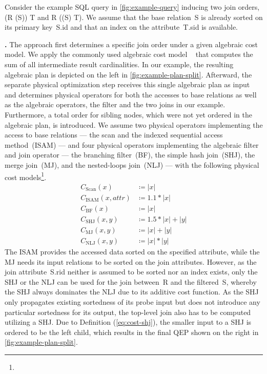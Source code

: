 \noindent Consider the example SQL query in \autoref{fig:example-query} inducing two join orders, \ie (R \join \filter(S)) \join T and R \join (\filter(S) \join T).  We assume that the base relation~S is already sorted on its primary key~S.id and that an index on the attribute~T.sid is available.

\textbf{\split.}
The approach \split first determines a specific join order under a given algebraic cost model.  We apply the commonly used algebraic cost model \Cout~\cite{book_moerkotte, mutable_join_ordering} that computes the sum of all intermediate result cardinalities.  In our example, the resulting algebraic plan is depicted on the left in \autoref{fig:example-plan-split}.  Afterward, the separate physical optimization step receives this single algebraic plan as input and determines physical operators for both the accesses to base relations as well as the algebraic operators, \ie the filter and the two joins in our example.  Furthermore, a total order for sibling nodes, which were not yet ordered in the algebraic plan, is introduced.  We assume two physical operators implementing the access to base relations --- the scan and the indexed sequential access method~(ISAM) --- and four physical operators implementing the algebraic filter and join operator --- the branching filter~(BF), the simple hash join~(SHJ), the merge join~(MJ), and the nested-loops join~(NLJ) --- with the following physical cost models\footnote{}.
\begin{align}
    C_\text{Scan}(x) &\coloneq |x| \label{eq:cost-scan}\\
    C_\text{ISAM}(x,\textit{attr}) &\coloneq 1.1 * |x| \label{eq:cost-isam}\\
    C_\text{BF}(x) &\coloneq |x| \label{eq:cost-bf}\\
    C_\text{SHJ}(x,y) &\coloneq 1.5 * |x| + |y| \label{eq:cost-shj}\\
    C_\text{MJ}(x,y) &\coloneq |x| + |y| \label{eq:cost-mj}\\
    C_\text{NLJ}(x,y) &\coloneq |x| * |y| \label{eq:cost-nlj}
\end{align}
The ISAM provides the accessed data sorted on the specified attribute, while the MJ needs its input relations to be sorted on the join attributes.  However, as the join attribute~S.rid neither is assumed to be sorted nor an index exists, only the SHJ or the NLJ can be used for the join between~R and the filtered~S, whereby the SHJ always dominates the NLJ due to its additive cost function.  As the SHJ only propagates existing sortedness of its probe input but does not introduce any particular sortedness for its output, the top-level join also has to be computed utilizing a SHJ.  Due to Definition (\ref{eq:cost-shj}), the smaller input to a SHJ is ordered to be the left child, which results in the final QEP shown on the right in \autoref{fig:example-plan-split}.

